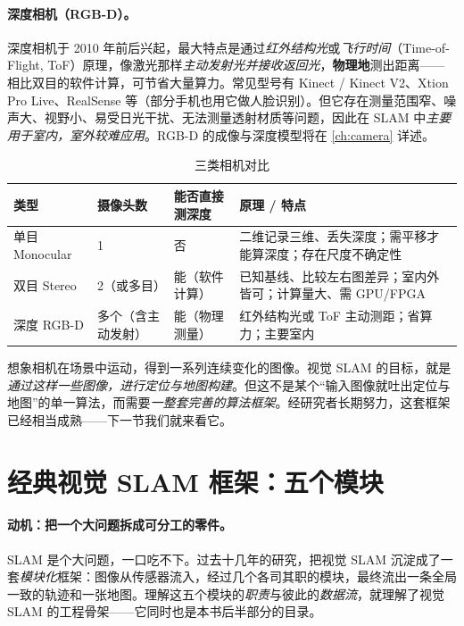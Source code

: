 \paragraph{深度相机（RGB-D）。}
深度相机于 2010 年前后兴起，最大特点是通过\emph{红外结构光}或\emph{飞行时间}（Time-of-Flight, ToF）原理，像激光那样\emph{主动发射光并接收返回光}，\textbf{物理地}测出距离——相比双目的软件计算，可节省大量算力\cite{gaoxiang2019slam14}。常见型号有 Kinect / Kinect V2、Xtion Pro Live、RealSense 等（部分手机也用它做人脸识别）。但它存在测量范围窄、噪声大、视野小、易受日光干扰、无法测量透射材质等问题，因此在 SLAM 中\emph{主要用于室内，室外较难应用}。RGB-D 的成像与深度模型将在 \cref{ch:camera} 详述。

\begin{table}[H]\centering\small
\caption{三类相机对比}
\label{tab:intro-cameras}
\begin{tabular}{p{} p{} p{} p{}}
\toprule
类型 & 摄像头数 & 能否直接测深度 & 原理 / 特点 \\
\midrule
单目 Monocular & 1 & 否 & 二维记录三维、丢失深度；需平移才能算深度；存在尺度不确定性 \\
双目 Stereo & 2（或多目） & 能（软件计算） & 已知基线、比较左右图差异；室内外皆可；计算量大、需 GPU/FPGA \\
深度 RGB-D & 多个（含主动发射） & 能（物理测量） & 红外结构光或 ToF 主动测距；省算力；主要室内 \\
\bottomrule
\end{tabular}
\end{table}

\noindent 想象相机在场景中运动，得到一系列连续变化的图像。视觉 SLAM 的目标，就是\emph{通过这样一些图像，进行定位与地图构建}\cite{gaoxiang2019slam14}。但这不是某个“输入图像就吐出定位与地图”的单一算法，而需要\emph{一整套完善的算法框架}。经研究者长期努力，这套框架已经相当成熟——下一节我们就来看它。

\section{经典视觉 SLAM 框架：五个模块}
\label{sec:intro-frame}

\paragraph{动机：把一个大问题拆成可分工的零件。}
SLAM 是个大问题，一口吃不下。过去十几年的研究，把视觉 SLAM 沉淀成了一套\emph{模块化}框架\cite{gaoxiang2019slam14}：图像从传感器流入，经过几个各司其职的模块，最终流出一条全局一致的轨迹和一张地图。理解这五个模块的\emph{职责}与彼此的\emph{数据流}，就理解了视觉 SLAM 的工程骨架——它同时也是本书后半部分的目录。

